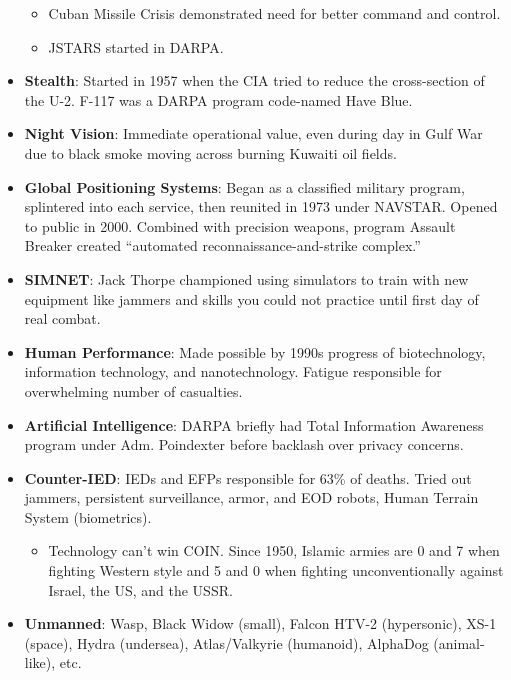 \documentclass[
]{article}
\providecommand{\tightlist}{%
  \setlength{\itemsep}{0pt}\setlength{\parskip}{0pt}}
\begin{document}
\begin{itemize}
  \begin{itemize}
  \item
    Cuban Missile Crisis demonstrated need for better command and
    control.
  \item
    JSTARS started in DARPA.
  \end{itemize}
\item
  \textbf{Stealth}: Started in 1957 when the CIA tried to reduce the
  cross-section of the U-2. F-117 was a DARPA program code-named Have
  Blue.
\item
  \textbf{Night Vision}: Immediate operational value, even during day in
  Gulf War due to black smoke moving across burning Kuwaiti oil fields.
\item
  \textbf{Global Positioning Systems}: Began as a classified military
  program, splintered into each service, then reunited in 1973 under
  NAVSTAR. Opened to public in 2000. Combined with precision weapons,
  program Assault Breaker created ``automated reconnaissance-and-strike
  complex.''
\item
  \textbf{SIMNET}: Jack Thorpe championed using simulators to train with
  new equipment like jammers and skills you could not practice until
  first day of real combat.
\item
  \textbf{Human Performance}: Made possible by 1990s progress of
  biotechnology, information technology, and nanotechnology. Fatigue
  responsible for overwhelming number of casualties.
\item
  \textbf{Artificial Intelligence}: DARPA briefly had Total Information
  Awareness program under Adm. Poindexter before backlash over privacy
  concerns.
\item
  \textbf{Counter-IED}: IEDs and EFPs responsible for 63\% of deaths.
  Tried out jammers, persistent surveillance, armor, and EOD robots,
  Human Terrain System (biometrics).

  \begin{itemize}
  \tightlist
  \item
    Technology can't win COIN. Since 1950, Islamic armies are 0 and 7
    when fighting Western style and 5 and 0 when fighting
    unconventionally against Israel, the US, and the USSR.
  \end{itemize}
\item
  \textbf{Unmanned}: Wasp, Black Widow (small), Falcon HTV-2
  (hypersonic), XS-1 (space), Hydra (undersea), Atlas/Valkyrie
  (humanoid), AlphaDog (animal-like), etc.
\end{itemize}
\end{document}
